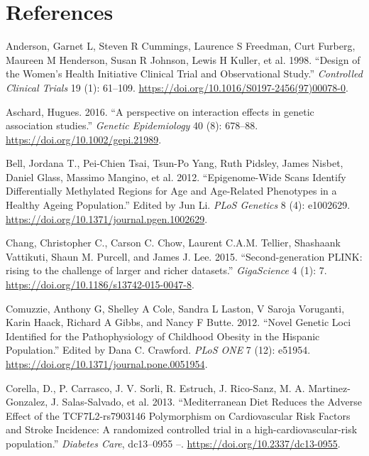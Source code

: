 \documentclass[]{article}
\begin{document}
\hypertarget{references}{%
\section*{References}\label{references}}

\hypertarget{refs}{}
\leavevmode\hypertarget{ref-Anderson1998}{}%
Anderson, Garnet L, Steven R Cummings, Laurence S Freedman, Curt
Furberg, Maureen M Henderson, Susan R Johnson, Lewis H Kuller, et al.
1998. ``Design of the Women's Health Initiative Clinical Trial and
Observational Study.'' \emph{Controlled Clinical Trials} 19 (1):
61--109. \url{https://doi.org/10.1016/S0197-2456(97)00078-0}.

\leavevmode\hypertarget{ref-Aschard2016}{}%
Aschard, Hugues. 2016. ``A perspective on interaction effects in genetic
association studies.'' \emph{Genetic Epidemiology} 40 (8): 678--88.
\url{https://doi.org/10.1002/gepi.21989}.

\leavevmode\hypertarget{ref-Bell2012}{}%
Bell, Jordana T., Pei-Chien Tsai, Tsun-Po Yang, Ruth Pidsley, James
Nisbet, Daniel Glass, Massimo Mangino, et al. 2012. ``Epigenome-Wide
Scans Identify Differentially Methylated Regions for Age and Age-Related
Phenotypes in a Healthy Ageing Population.'' Edited by Jun Li.
\emph{PLoS Genetics} 8 (4): e1002629.
\url{https://doi.org/10.1371/journal.pgen.1002629}.

\leavevmode\hypertarget{ref-Chang2015}{}%
Chang, Christopher C., Carson C. Chow, Laurent C.A.M. Tellier, Shashaank
Vattikuti, Shaun M. Purcell, and James J. Lee. 2015. ``Second-generation
PLINK: rising to the challenge of larger and richer datasets.''
\emph{GigaScience} 4 (1): 7.
\url{https://doi.org/10.1186/s13742-015-0047-8}.

\leavevmode\hypertarget{ref-Comuzzie2012}{}%
Comuzzie, Anthony G, Shelley A Cole, Sandra L Laston, V Saroja
Voruganti, Karin Haack, Richard A Gibbs, and Nancy F Butte. 2012.
``Novel Genetic Loci Identified for the Pathophysiology of Childhood
Obesity in the Hispanic Population.'' Edited by Dana C. Crawford.
\emph{PLoS ONE} 7 (12): e51954.
\url{https://doi.org/10.1371/journal.pone.0051954}.

\leavevmode\hypertarget{ref-Corella2013}{}%
Corella, D., P. Carrasco, J. V. Sorli, R. Estruch, J. Rico-Sanz, M. A.
Martinez-Gonzalez, J. Salas-Salvado, et al. 2013. ``Mediterranean Diet
Reduces the Adverse Effect of the TCF7L2-rs7903146 Polymorphism on
Cardiovascular Risk Factors and Stroke Incidence: A randomized
controlled trial in a high-cardiovascular-risk population.''
\emph{Diabetes Care}, dc13--0955 --.
\url{https://doi.org/10.2337/dc13-0955}.
\end{document}
